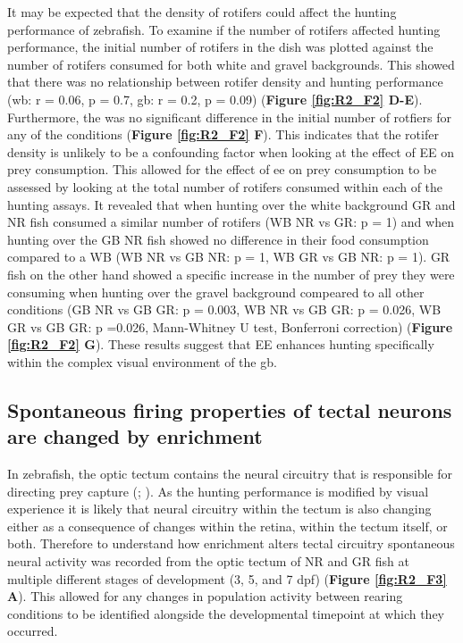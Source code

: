 It may be expected that the density of rotifers could affect the hunting performance of zebrafish. To examine if the number of rotifers affected hunting performance, the initial number of rotifers in the dish was plotted against the number of rotifers consumed for both white and gravel backgrounds.  This showed that there was no relationship between rotifer density and hunting performance (\gls{wb}: r = 0.06, p = 0.7, \gls{gb}: r = 0.2, p = 0.09) (\textbf{Figure \ref{fig:R2_F2} D-E}). Furthermore, the was no significant difference in the initial number of rotfiers for any of the conditions (\textbf{Figure \ref{fig:R2_F2} F}). This indicates that the rotifer density is unlikely to be a confounding factor when looking at the effect of EE on prey consumption. This allowed for the effect of \gls{ee} on prey consumption to be assessed by looking at the total number of rotifers consumed within each of the hunting assays. It revealed that when hunting over the white background GR and NR fish consumed a similar number of rotifers (WB NR vs GR: p = 1) and when hunting over the GB NR fish showed no difference in their food consumption compared to a WB (WB NR vs GB NR: p = 1, WB GR vs GB NR: p = 1). GR fish on the other hand showed a specific increase in the number of prey they were consuming when hunting over the gravel background compeared to all other conditions (GB NR vs GB GR: p = 0.003, WB NR vs GB GR: p =  0.026, WB GR vs GB GR: p =0.026, Mann-Whitney U test, Bonferroni correction)  (\textbf{Figure \ref{fig:R2_F2} G}). These results suggest that EE enhances hunting specifically within the complex visual environment of the \gls{gb}.


\subsection{Spontaneous firing properties of tectal neurons are changed by enrichment}
 In zebrafish, the optic tectum contains the neural circuitry that is responsible for directing prey capture (\cite{Gahtan2005}; \cite{Bianco2015}). As the hunting performance is modified by visual experience it is likely that neural circuitry within the tectum is also changing either as a consequence of changes within the retina, within the tectum itself, or both. Therefore to understand how enrichment alters tectal circuitry spontaneous neural activity was recorded from the optic tectum of NR and GR fish at multiple different stages of development (3, 5, and 7 \gls{dpf}) (\textbf{Figure \ref{fig:R2_F3} A}). This allowed for any changes in population activity between rearing conditions to be identified alongside the developmental timepoint at which they occurred. 
 
